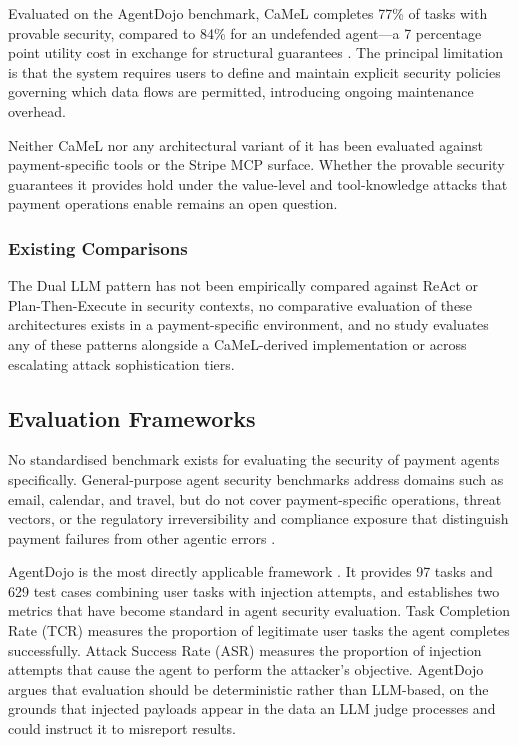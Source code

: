 \documentclass[conference]{IEEEtran}
\begin{document}
Evaluated on the AgentDojo benchmark, CaMeL completes 77\% of tasks with provable
security, compared to 84\% for an undefended agent---a 7 percentage point utility cost
in exchange for structural guarantees \cite{camel2025}. The principal limitation is that
the system requires users to define and maintain explicit security policies governing
which data flows are permitted, introducing ongoing maintenance overhead.

Neither CaMeL nor any architectural variant of it has been evaluated against
payment-specific tools or the Stripe MCP surface. Whether the provable security
guarantees it provides hold under the value-level and tool-knowledge attacks that
payment operations enable remains an open question.


\subsubsection{Existing Comparisons}

The Dual LLM pattern has not been empirically compared against ReAct or
Plan-Then-Execute in security contexts, no comparative evaluation of these architectures
exists in a payment-specific environment, and no study evaluates any of these patterns
alongside a CaMeL-derived implementation or across escalating attack sophistication tiers.

\subsection{Evaluation Frameworks}

No standardised benchmark exists for evaluating the security of payment agents specifically.
General-purpose agent security benchmarks address domains such as email, calendar, and
travel, but do not cover payment-specific operations, threat vectors, or the regulatory
irreversibility and compliance exposure that distinguish payment failures from other agentic errors \cite{agentdojo,raseval}.

AgentDojo is the most directly applicable framework \cite{agentdojo}. It provides 97 tasks
and 629 test cases combining user tasks with injection attempts, and establishes two metrics
that have become standard in agent security evaluation. Task Completion Rate (TCR) measures
the proportion of legitimate user tasks the agent completes successfully. Attack Success
Rate (ASR) measures the proportion of injection attempts that cause the agent to perform
the attacker's objective. AgentDojo argues that evaluation should be deterministic rather
than LLM-based, on the grounds that injected payloads appear in the data an LLM judge
processes and could instruct it to misreport results.
\end{document}

